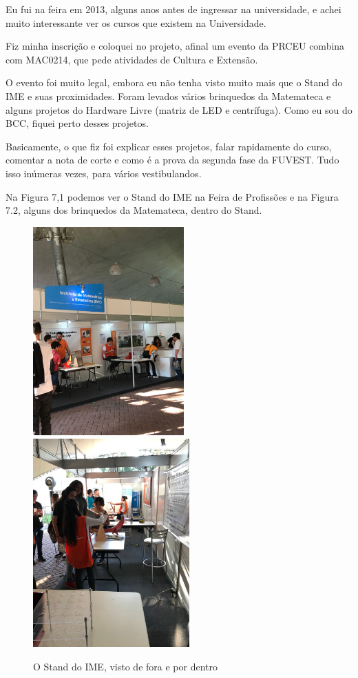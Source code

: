 \documentclass[12pt,letterpaper]{article}
\begin{document}
	Eu fui na feira em 2013, alguns anos antes de ingressar na universidade, e achei muito interessante ver os cursos que existem na Universidade.
	
	Fiz minha inscrição e coloquei no projeto, afinal um evento da PRCEU combina com MAC0214, que pede atividades de Cultura e Extensão.
	
	O evento foi muito legal, embora eu não tenha visto muito mais que o Stand do IME e suas proximidades. Foram levados vários brinquedos da Matemateca e alguns projetos do Hardware Livre (matriz de LED e centrífuga). Como eu sou do BCC, fiquei perto desses projetos.
	
	Basicamente, o que fiz foi explicar esses projetos, falar rapidamente do curso, comentar a nota de corte e como é a prova da segunda fase da FUVEST. Tudo isso inúmeras vezes, para vários vestibulandos. 
	
	Na Figura 7,1 podemos ver o Stand do IME na Feira de Profissões e na Figura 7.2, alguns dos brinquedos da Matemateca, dentro do Stand.
	
	\begin{figure}
		\begin{center}
			\includegraphics[height=8cm]{stand.JPG}
			\includegraphics[height=8cm]{dentro.JPG}  
			\caption{O Stand do IME, visto de fora e por dentro} 
		\end{center}
	\end{figure}
\end{document}
